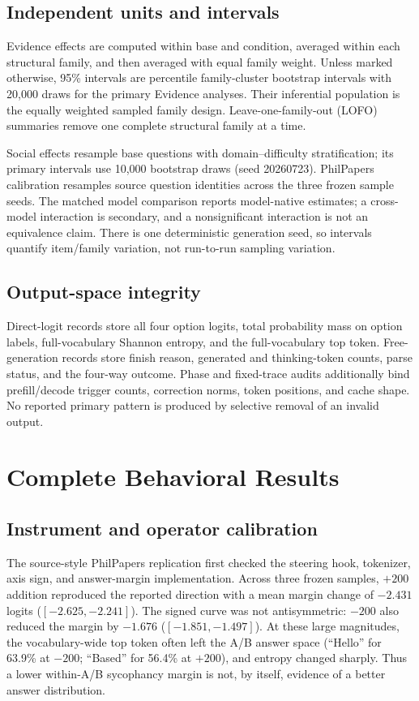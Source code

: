 \documentclass[letterpaper]{article}
\begin{document}
\subsection{Independent units and intervals}

Evidence effects are computed within base and condition, averaged within each structural family, and then averaged with equal family weight.  Unless marked otherwise, 95\% intervals are percentile family-cluster bootstrap intervals with 20,000 draws for the primary Evidence analyses.  Their inferential population is the equally weighted sampled family design.  Leave-one-family-out (LOFO) summaries remove one complete structural family at a time.

Social effects resample base questions with domain--difficulty stratification; its primary intervals use 10,000 bootstrap draws (seed 20260723).  PhilPapers calibration resamples source question identities across the three frozen sample seeds.  The matched model comparison reports model-native estimates; a cross-model interaction is secondary, and a nonsignificant interaction is not an equivalence claim.  There is one deterministic generation seed, so intervals quantify item/family variation, not run-to-run sampling variation.

\subsection{Output-space integrity}

Direct-logit records store all four option logits, total probability mass on option labels, full-vocabulary Shannon entropy, and the full-vocabulary top token.  Free-generation records store finish reason, generated and thinking-token counts, parse status, and the four-way outcome.  Phase and fixed-trace audits additionally bind prefill/decode trigger counts, correction norms, token positions, and cache shape.  No reported primary pattern is produced by selective removal of an invalid output.

\section{Complete Behavioral Results}
\label{supp:behavior}

\subsection{Instrument and operator calibration}

The source-style PhilPapers replication first checked the steering hook, tokenizer, axis sign, and answer-margin implementation.  Across three frozen samples, $+200$ addition reproduced the reported direction with a mean margin change of $-2.431$ logits ($[-2.625,-2.241]$).  The signed curve was not antisymmetric: $-200$ also reduced the margin by $-1.676$ ($[-1.851,-1.497]$).  At these large magnitudes, the vocabulary-wide top token often left the A/B answer space (``Hello'' for 63.9\% at $-200$; ``Based'' for 56.4\% at $+200$), and entropy changed sharply.  Thus a lower within-A/B sycophancy margin is not, by itself, evidence of a better answer distribution.
\end{document}
